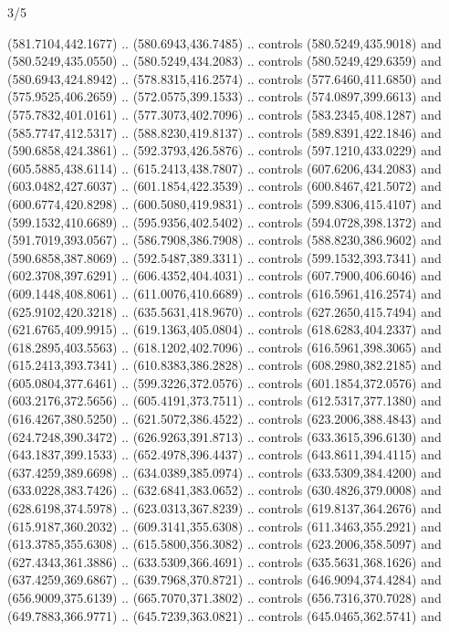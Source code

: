 \begin{flagdescription}{3/5}
\begin{scope}[xshift=0.5\flaglength]
\begin{scope}[scale=0.00167\flagwidth,yshift=210.9mm,xshift=-175.8mm]
\begin{scope}[y=-1pt, x=1pt]
  (581.7104,442.1677) .. (580.6943,436.7485) .. controls (580.5249,435.9018) and
  (580.5249,435.0550) .. (580.5249,434.2083) .. controls (580.5249,429.6359) and
  (580.6943,424.8942) .. (578.8315,416.2574) .. controls (577.6460,411.6850) and
  (575.9525,406.2659) .. (572.0575,399.1533) .. controls (574.0897,399.6613) and
  (575.7832,401.0161) .. (577.3073,402.7096) .. controls (583.2345,408.1287) and
  (585.7747,412.5317) .. (588.8230,419.8137) .. controls (589.8391,422.1846) and
  (590.6858,424.3861) .. (592.3793,426.5876) .. controls (597.1210,433.0229) and
  (605.5885,438.6114) .. (615.2413,438.7807) .. controls (607.6206,434.2083) and
  (603.0482,427.6037) .. (601.1854,422.3539) .. controls (600.8467,421.5072) and
  (600.6774,420.8298) .. (600.5080,419.9831) .. controls (599.8306,415.4107) and
  (599.1532,410.6689) .. (595.9356,402.5402) .. controls (594.0728,398.1372) and
  (591.7019,393.0567) .. (586.7908,386.7908) .. controls (588.8230,386.9602) and
  (590.6858,387.8069) .. (592.5487,389.3311) .. controls (599.1532,393.7341) and
  (602.3708,397.6291) .. (606.4352,404.4031) .. controls (607.7900,406.6046) and
  (609.1448,408.8061) .. (611.0076,410.6689) .. controls (616.5961,416.2574) and
  (625.9102,420.3218) .. (635.5631,418.9670) .. controls (627.2650,415.7494) and
  (621.6765,409.9915) .. (619.1363,405.0804) .. controls (618.6283,404.2337) and
  (618.2895,403.5563) .. (618.1202,402.7096) .. controls (616.5961,398.3065) and
  (615.2413,393.7341) .. (610.8383,386.2828) .. controls (608.2980,382.2185) and
  (605.0804,377.6461) .. (599.3226,372.0576) .. controls (601.1854,372.0576) and
  (603.2176,372.5656) .. (605.4191,373.7511) .. controls (612.5317,377.1380) and
  (616.4267,380.5250) .. (621.5072,386.4522) .. controls (623.2006,388.4843) and
  (624.7248,390.3472) .. (626.9263,391.8713) .. controls (633.3615,396.6130) and
  (643.1837,399.1533) .. (652.4978,396.4437) .. controls (643.8611,394.4115) and
  (637.4259,389.6698) .. (634.0389,385.0974) .. controls (633.5309,384.4200) and
  (633.0228,383.7426) .. (632.6841,383.0652) .. controls (630.4826,379.0008) and
  (628.6198,374.5978) .. (623.0313,367.8239) .. controls (619.8137,364.2676) and
  (615.9187,360.2032) .. (609.3141,355.6308) .. controls (611.3463,355.2921) and
  (613.3785,355.6308) .. (615.5800,356.3082) .. controls (623.2006,358.5097) and
  (627.4343,361.3886) .. (633.5309,366.4691) .. controls (635.5631,368.1626) and
  (637.4259,369.6867) .. (639.7968,370.8721) .. controls (646.9094,374.4284) and
  (656.9009,375.6139) .. (665.7070,371.3802) .. controls (656.7316,370.7028) and
  (649.7883,366.9771) .. (645.7239,363.0821) .. controls (645.0465,362.5741) and

\end{scope}
\end{scope}
\end{scope}
\end{flagdescription}
